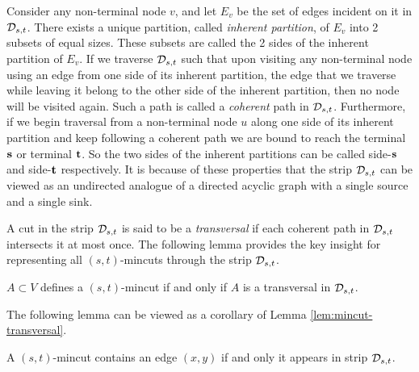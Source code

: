  Consider any non-terminal node $v$, and let $E_v$ be the set of edges incident on it in ${\cal D}_{s,t}$. There exists a unique partition, called {\em inherent partition}, of $E_v$ into 2 subsets of equal sizes. These subsets are called the 2 sides of the inherent partition of $E_v$. 
If we traverse ${\cal D}_{s,t}$ such that upon visiting any non-terminal node using an edge from one side of its inherent partition, the edge that we traverse while leaving it belong to the other side of the inherent partition, then no node will be visited again. Such a path is called a {\em coherent} path in ${\cal D}_{s,t}$. Furthermore, if we begin traversal from a non-terminal node $u$ along one side of its inherent partition and keep following a coherent path we are bound to reach the terminal ${\bf s}$ or terminal ${\bf t}$. So the two sides of the inherent partitions can be called side-${\bf s}$ and side-${\bf t}$ respectively.
It is because of these properties
that the strip ${\cal D}_{s,t}$ can be viewed as an undirected analogue of a directed acyclic graph with a single source and a single sink. 

A cut in the strip ${\cal D}_{s,t}$ is said to be a \textit{transversal} if each coherent path in ${\cal D}_{s,t}$ intersects it at most once. The following lemma provides the key insight for representing all $(s,t)$-mincuts through the strip ${\cal D}_{s,t}$.
\begin{lemma}
    $A\subset V$ defines a $(s,t)$-mincut if and only if $A$ is a transversal in ${\cal D}_{s,t}$.
    \label{lem:mincut-transversal}
\end{lemma}

The following lemma can be viewed as a corollary of Lemma \ref{lem:mincut-transversal}.

\begin{lemma}
A $(s,t)$-mincut contains an edge $(x,y)$ if and only it appears in strip ${\cal D}_{s,t}$.
\label{lem:E_y-edges-same-side}
\end{lemma}


